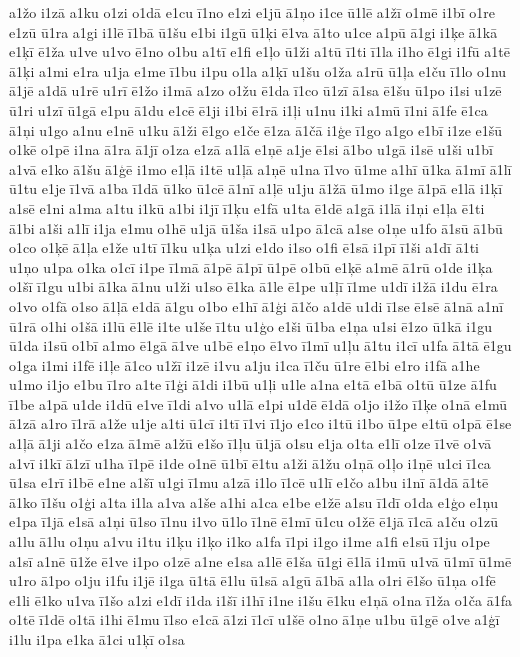 {a1žo
i1zā
a1ku
o1zi
o1dā
e1cu
ī1no
e1zi
e1jū
ā1ņo
i1ce
ū1lē
a1žī
o1mē
i1bī
o1re
e1zū
ū1ra
a1gi
i1lē
ī1bā
ū1šu
e1bi
i1gū
ū1ķi
ē1va
ā1to
u1ce
a1pū
ā1gi
i1ķe
ā1kā
e1ķī
ē1ža
u1ve
u1vo
ē1no
o1bu
a1tī
e1fi
e1ļo
ū1ži
a1tū
ī1ti
ī1la
i1ho
ē1gi
i1fū
a1tē
ā1ķi
a1mi
e1ra
u1ja
e1me
ī1bu
i1pu
o1la
a1ķī
u1šu
o1ža
a1rū
ū1ļa
e1ču
ī1lo
o1nu
ā1jē
a1dā
u1rē
u1rī
ē1žo
i1mā
a1zo
o1žu
ē1da
ī1co
ū1zī
ā1sa
ē1šu
ū1po
i1si
u1zē
ū1ri
u1zī
ū1gā
e1pu
ā1du
e1cē
ē1ji
i1bi
ē1rā
i1ļi
u1nu
i1ki
a1mū
ī1ni
ā1fe
ē1ca
ā1ņi
u1go
a1nu
e1nē
u1ku
ā1ži
ē1go
e1če
ē1za
ā1čā
i1ģe
ī1go
a1go
e1bī
i1ze
e1šū
o1kē
o1pē
i1na
ā1ra
ā1jī
o1za
e1zā
a1lā
e1ņē
a1je
ē1si
ā1bo
u1gā
i1sē
u1ši
u1bī
a1vā
e1ko
ā1šu
ā1ģē
i1mo
e1ļā
i1tē
u1ļā
a1ņē
u1na
ī1vo
ū1me
a1hī
ū1ka
ā1mī
ā1lī
ū1tu
e1je
ī1vā
a1ba
ī1dā
ū1ko
ū1cē
ā1nī
a1ļē
u1ju
ā1žā
ū1mo
i1ge
ā1pā
e1lā
i1ķī
a1sē
e1ni
a1ma
a1tu
i1kū
a1bi
i1jī
ī1ķu
e1fā
u1ta
ē1dē
a1gā
i1lā
i1ņi
e1ļa
ē1ti
ā1bi
a1ši
a1lī
i1ja
e1mu
o1hē
u1jā
ū1ša
i1sā
u1po
ā1cā
a1se
o1ņe
u1fo
ā1sū
ā1bū
o1co
o1ķē
ā1ļa
e1že
u1tī
ī1ku
u1ķa
u1zi
e1do
i1so
o1fi
ē1sā
i1pī
ī1ši
a1dī
ā1ti
u1ņo
u1pa
o1ka
o1cī
i1pe
ī1mā
ā1pē
ā1pī
ū1pē
o1bū
e1ķē
a1mē
ā1rū
o1de
i1ķa
o1šī
ī1gu
u1bi
ā1ka
ā1nu
u1ži
u1so
ē1ka
ā1le
ē1pe
u1ļī
ī1me
u1dī
i1žā
i1du
ē1ra
o1vo
o1fā
o1so
ā1ļā
e1dā
ā1gu
o1bo
e1hī
ā1ģi
ā1čo
a1dē
u1di
ī1se
ē1sē
ā1nā
a1nī
ū1rā
o1hi
o1šā
i1lū
ē1lē
i1te
u1še
ī1tu
u1ģo
e1ši
ū1ba
e1ņa
u1si
ē1zo
ū1kā
i1gu
ū1da
i1sū
o1bī
a1mo
ē1gā
ā1ve
u1bē
e1ņo
ē1vo
ī1mī
u1ļu
ā1tu
i1cī
u1fa
ā1tā
ē1gu
o1ga
i1mi
i1fē
i1ļe
ā1co
u1žī
i1zē
i1vu
a1ju
i1ca
ī1ču
ū1re
ē1bi
e1ro
i1fā
a1he
u1mo
i1jo
e1bu
ī1ro
a1te
ī1ģi
ā1di
i1bū
u1ļi
u1le
a1na
e1tā
e1bā
o1tū
ū1ze
ā1fu
ī1be
a1pā
u1de
i1dū
e1ve
ī1di
a1vo
u1lā
e1pi
u1dē
ē1dā
o1jo
i1žo
ī1ķe
o1nā
e1mū
ā1zā
a1ro
ī1rā
a1že
u1je
a1ti
ū1cī
i1tī
ī1vi
ī1jo
e1co
i1tū
i1bo
ū1pe
e1tū
o1pā
ē1se
a1ļā
ā1ji
a1čo
e1za
ā1mē
a1žū
e1šo
ī1ļu
ū1jā
o1su
e1ja
o1ta
e1lī
o1ze
ī1vē
o1vā
a1vī
i1kī
ā1zī
u1ha
ī1pē
i1de
o1nē
ū1bī
ē1tu
a1ži
ā1žu
o1ņā
o1ļo
i1ņē
u1ci
ī1ca
ū1sa
e1rī
i1bē
e1ne
a1šī
u1gi
ī1mu
a1zā
i1lo
ī1cē
u1lī
e1čo
a1bu
i1nī
ā1dā
ā1tē
ā1ko
ī1šu
o1ģi
a1ta
i1la
a1va
a1še
a1hi
a1ca
e1be
e1žē
a1su
ī1dī
o1da
e1ģo
e1ņu
e1pa
ī1jā
e1sā
a1ņi
ū1so
ī1nu
i1vo
ū1lo
ī1nē
ē1mī
ū1cu
o1žē
ē1jā
ī1cā
a1ču
o1zū
a1lu
ā1lu
o1ņu
a1vu
i1tu
i1ķu
i1ķo
i1ko
a1fa
ī1pi
i1go
i1me
a1fi
e1sū
ī1ju
o1pe
a1sī
a1nē
ū1že
ē1ve
i1po
o1zē
a1ne
e1sa
a1lē
ē1ša
ū1gi
ē1lā
i1mū
u1vā
ū1mī
ū1mē
u1ro
ā1po
o1ju
i1fu
i1jē
i1ga
ū1tā
ē1lu
ū1sā
a1gū
ā1bā
a1la
o1ri
ē1šo
ū1ņa
o1fē
e1li
ē1ko
u1va
ī1šo
a1zi
e1dī
i1da
i1šī
i1hī
i1ne
i1šu
ē1ku
e1ņā
o1na
ī1ža
o1ča
ā1fa
o1tē
ī1dē
o1tā
i1hi
ē1mu
ī1so
e1cā
ā1zi
ī1cī
u1šē
o1no
ā1ņe
u1bu
ū1gē
o1ve
a1ģī
i1lu
i1pa
e1ka
ā1ci
u1ķī
o1sa
}
